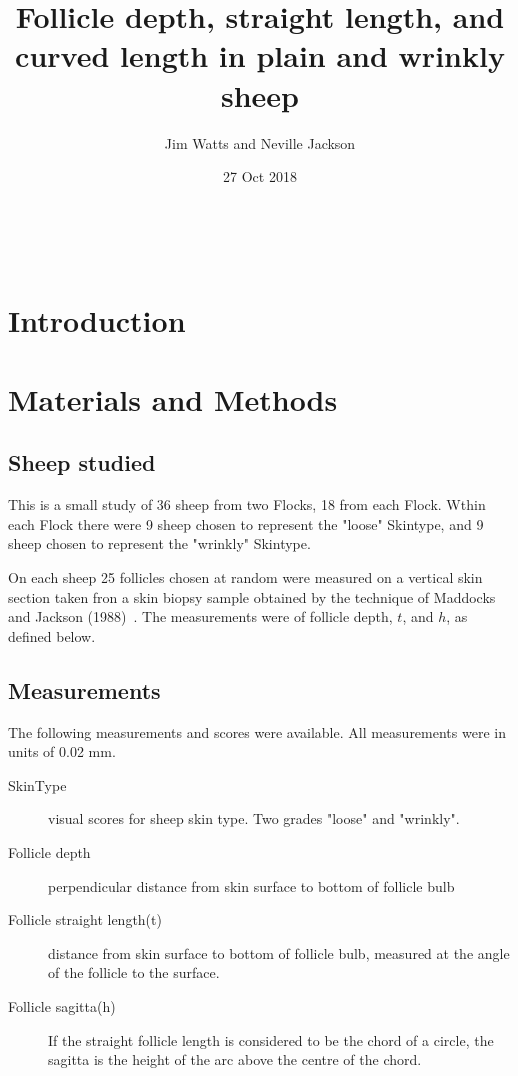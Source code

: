\documentclass[titlepage]{article}  %
\title{Follicle depth, straight length, and curved length in plain and wrinkly sheep}
\author{Jim Watts and Neville Jackson}
\date{27  Oct 2018}
\begin{document}
 


 
\maketitle      
\tableofcontents

$\newcommand{\E}{\mathrm{E}}$
$\newcommand{\Var}{\mathrm{Var}}$
$\newcommand{\Cov}{\mathrm{Cov}}$ 
$\newcommand{\SD}{\mathrm{SD}}$ 

\clearpage
\section{Introduction} 

\section{Materials and Methods}
\subsection{Sheep studied}
This is a small study of 36 sheep from two Flocks, 18 from each Flock. Wthin each Flock there were 9 sheep chosen to represent the "loose" Skintype, and 9 sheep chosen to represent the "wrinkly" Skintype. 

On each sheep 25 follicles chosen at random were measured on a vertical skin section taken fron a skin biopsy sample obtained by the technique of Maddocks and Jackson (1988)~\cite{madd:88}. The measurements were of follicle depth, $t$, and $h$, as defined below.

\subsection{Measurements}
The following measurements and scores were available. All measurements were in units of 0.02 mm. 
\begin{description}
\item[SkinType] visual scores for sheep skin type. Two grades "loose" and "wrinkly". 
\item[Follicle depth] perpendicular distance from skin surface to bottom of follicle bulb
\item[Follicle straight length(t)] distance from skin surface to bottom of follicle bulb, measured at the angle of the follicle to the surface.
\item[Follicle sagitta(h)] If the straight follicle length is considered to be the chord of a circle, the sagitta is the height of the arc above the centre of the chord.
\end{description}
\end{document}
